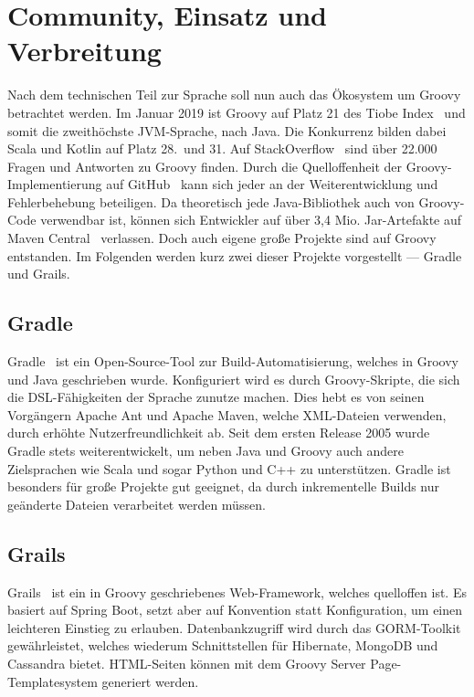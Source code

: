 
\section{Community, Einsatz und Verbreitung}\label{sec:community}

Nach dem technischen Teil zur Sprache soll nun auch das Ökosystem um Groovy betrachtet werden.
Im Januar 2019 ist Groovy auf Platz 21 des Tiobe Index~\cite{tiobe-index} und somit die zweithöchste JVM-Sprache, nach Java.
Die Konkurrenz bilden dabei Scala und Kotlin auf Platz 28.~und 31.
Auf StackOverflow~\cite{stackoverflow:groovy} sind über 22.000 Fragen und Antworten zu Groovy finden.
Durch die Quelloffenheit der Groovy-Implementierung auf GitHub~\cite{github:groovy} kann sich jeder an der Weiterentwicklung und Fehlerbehebung beteiligen.
Da theoretisch jede Java-Bibliothek auch von Groovy-Code verwendbar ist, können sich Entwickler auf über 3,4 Mio. Jar-Artefakte auf Maven Central~\cite{maven-central} verlassen.
Doch auch eigene große Projekte sind auf Groovy entstanden.
Im Folgenden werden kurz zwei dieser Projekte vorgestellt --- Gradle und Grails.

\subsection{Gradle}\label{subsec:gradle}

Gradle~\cite{gradle} ist ein Open-Source-Tool zur Build-Automatisierung, welches in Groovy und Java geschrieben wurde.
Konfiguriert wird es durch Groovy-Skripte, die sich die DSL-Fähigkeiten der Sprache zunutze machen.
Dies hebt es von seinen Vorgängern Apache Ant und Apache Maven, welche XML-Dateien verwenden, durch erhöhte Nutzerfreundlichkeit ab.
Seit dem ersten Release 2005 wurde Gradle stets weiterentwickelt, um neben Java und Groovy auch andere Zielsprachen wie Scala und sogar Python und C++ zu unterstützen.
Gradle ist besonders für große Projekte gut geeignet, da durch inkrementelle Builds nur geänderte Dateien verarbeitet werden müssen.

\subsection{Grails}\label{subsec:grails}

Grails~\cite{grails} ist ein in Groovy geschriebenes Web-Framework, welches quelloffen ist.
Es basiert auf Spring Boot, setzt aber auf Konvention statt Konfiguration, um einen leichteren Einstieg zu erlauben.
Datenbankzugriff wird durch das GORM-Toolkit gewährleistet, welches wiederum Schnittstellen für Hibernate, MongoDB und Cassandra bietet.
HTML-Seiten können mit dem Groovy Server Page-Templatesystem generiert werden.

